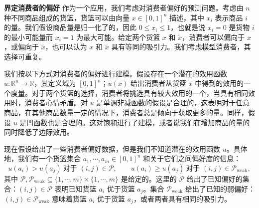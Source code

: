 \documentclass[UTF8,12pt,a4paper,fontset=fandol]{ctexart}
\begin{document}
\noindent\textbf{界定消费者的偏好}\quad
作为一个应用，我们考虑对消费者偏好的预测问题。考虑由 $n$ 种不同商品组成的货篮，货篮可以由向量 $x\in[0,1]^n$ 描述，其中 $x_i$ 表示商品 $i$ 的量。我们假设商品量是归一化了的，因此 $0\leq x_i\leq 1$，也就是说 $x_i=0$ 是货物 $i$ 的最小可能量而 $x_i=1$ 为最大可能。给定两个货篮 $x$ 和 $\tilde{x}$，消费者可以偏向于 $x$，或偏向于 $\tilde{x}$，也可以认为 $x$ 和 $\tilde{x}$ 具有等同的吸引力。我们考虑模型消费者，其选择可重复。

我们按以下方式对消费者的偏好进行建模。假设存在一个潜在的效用函数 $u:\mathbb{R}^n\to\mathbb{R}$，其定义域为 $[0,1]^n$；$u(x)$ 给出消费者从货篮 $x$ 中得到的效用的一个度量。对于两个货篮的选择，消费者将挑选具有较大效用的一个，当具有相同效用时，消费者心情矛盾。对 $u$ 是单调非减函数的假设是合理的，这表明对于任意商品，在其他商品数量一定的情况下，消费者总是倾向于获取更多的量。同样，假设 $u$ 是凹函数也是合理的。这对饱和进行了建模，或者说我们在增加商品的量的同时降低了边际效用。

现在假设给出了一些消费者偏好数据，但是我们不知道潜在的效用函数 $u$。具体地，我们有一个货篮集合 $a_1,\cdots,a_m\in[0,1]^n$ 和关于它们之间偏好度的信息：
\begin{equation}
u(a_i)>u(a_j)\ \text{对于 }(i,j)\in\mathcal{P},\qquad
u(a_i)\geq u(a_j)\ \text{对于 }(i,j)\in\mathcal{P}_{\mathrm{weak}},
\tag{6.22}
\end{equation}
其中 $\mathcal{P},\mathcal{P}_{\mathrm{weak}}\subseteq\{1,\cdots,m\}\times\{1,\cdots,m\}$ 是给定的。这里的 $\mathcal{P}$ 给出了已知偏好的集合：$(i,j)\in\mathcal{P}$ 表明已知货篮 $a_i$ 优于货篮 $a_j$。集合 $\mathcal{P}_{\mathrm{weak}}$ 给出了已知的弱偏好：$(i,j)\in\mathcal{P}_{\mathrm{weak}}$ 意味着货篮 $a_i$ 优于货篮 $a_j$，或者两者具有相同的吸引力。
\end{document}
